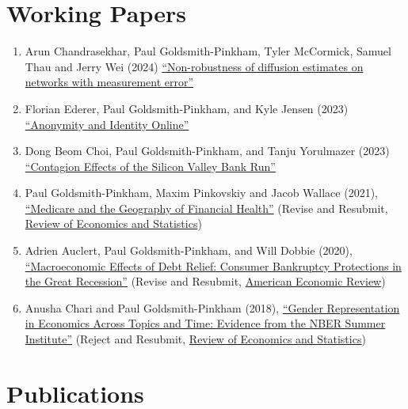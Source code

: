 \documentclass[letterpaper]{article}
\begin{document}
\section*{Working Papers}

\begin{enumerate}
\item Arun Chandrasekhar, Paul Goldsmith-Pinkham, Tyler McCormick, Samuel Thau and Jerry Wei (2024) \href{https://paulgp.github.io/papers/diffusion_error_CGPMTW.pdf}{``Non-robustness of diffusion estimates on networks with measurement error''}
\item Florian Ederer, Paul Goldsmith-Pinkham, and Kyle Jensen (2023) \href{https://florianederer.github.io/ejmr.pdf}{``Anonymity and Identity Online''}
\item Dong Beom Choi, Paul Goldsmith-Pinkham, and Tanju Yorulmazer (2023) \href{https://arxiv.org/pdf/2308.06642.pdf}{``Contagion Effects of the Silicon Valley Bank Run''} 
\item Paul Goldsmith-Pinkham, Maxim Pinkovskiy and Jacob Wallace (2021), \href{http://paulgp.github.io/papers/GPW_compressed.pdf}{``Medicare and the Geography of Financial Health''} (Revise and Resubmit, \ul{Review of Economics and Statistics})
\item Adrien Auclert, Paul Goldsmith-Pinkham, and Will Dobbie (2020), \href{http://paulgp.github.io/papers/Macroeconomic_Effects_of_Debt_Relief_Posting_342019.pdf}{``Macroeconomic Effects of Debt Relief: Consumer Bankruptcy Protections in the Great Recession''} (Revise and Resubmit, \ul{American Economic Review})
\item Anusha Chari and  Paul Goldsmith-Pinkham (2018), \href{http://paulgp.github.io/papers/cgp_nbergender.pdf}{``Gender Representation in Economics Across Topics and Time: Evidence from the NBER Summer Institute''} (Reject and Resubmit, \ul{Review of Economics and Statistics})
\end{enumerate}

\section*{Publications}
\end{document}
